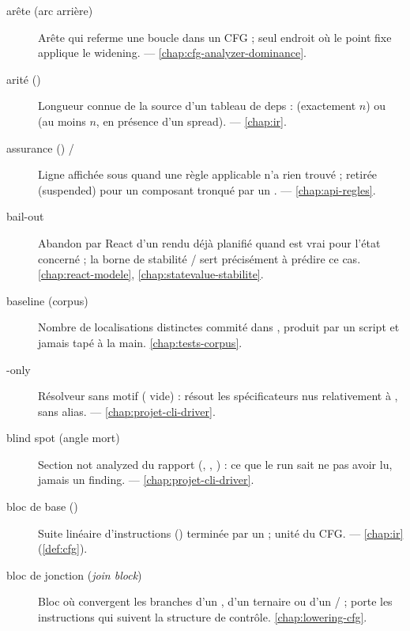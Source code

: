 \begin{description}
\item[arête  (arc arrière)] Arête qui referme une boucle dans un CFG ; seul endroit où le point fixe applique le widening.  — \cref{chap:cfg-analyzer-dominance}.

\item[arité ()] Longueur connue de la source d'un tableau de deps :  (exactement \(n\)) ou  (au moins \(n\), en présence d'un spread).  — \cref{chap:ir}.

\item[assurance () / ] Ligne affichée sous  quand une règle applicable n'a rien trouvé ; retirée (\og suspended\fg{}) pour un composant tronqué par un .  — \cref{chap:api-regles}.

\item[bail-out] Abandon par React d'un rendu déjà planifié quand  est vrai pour l'état concerné ; la borne de stabilité / sert précisément à prédire ce cas. \cref{chap:react-modele}, \cref{chap:statevalue-stabilite}.

\item[baseline (corpus)] Nombre de localisations distinctes commité dans , produit par un script et jamais tapé à la main. \cref{chap:tests-corpus}.

\item[-only] Résolveur  sans motif ( vide) : résout les spécificateurs nus relativement à , sans alias.  — \cref{chap:projet-cli-driver}.

\item[blind spot (angle mort)] Section \og not analyzed\fg{} du rapport (, , ) : ce que le run sait ne pas avoir lu, jamais un finding.  — \cref{chap:projet-cli-driver}.

\item[bloc de base ()] Suite linéaire d'instructions () terminée par un  ; unité du CFG.  — \cref{chap:ir} (\cref{def:cfg}).

\item[bloc de jonction (\emph{join block})] Bloc où convergent les branches d'un , d'un ternaire ou d'un \code{\&\&}/\code{||} ; porte les instructions qui suivent la structure de contrôle. \cref{chap:lowering-cfg}.


\end{description}
